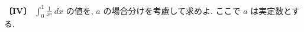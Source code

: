 \noindent\textbf{〔IV〕}
$\displaystyle\int_0^1 \frac{1}{x^a}\,dx$ の値を,
$a$ の場合分けを考慮して求めよ. ここで $a$ は実定数とする.
